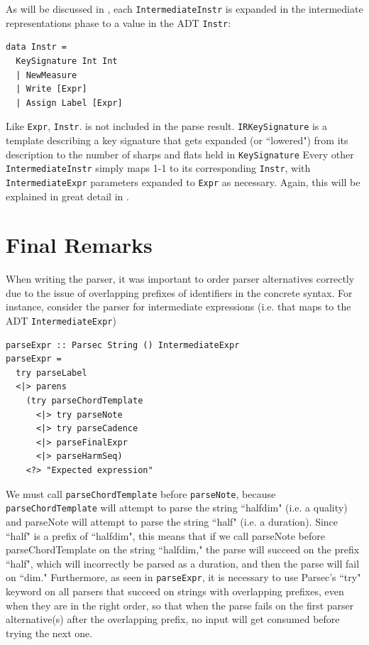 \documentclass{report}
\begin{document}
As will be discussed in , each \verb.IntermediateInstr. is expanded in the intermediate representations phase to a value in the ADT \verb.Instr.:

\begin{verbatim}
data Instr = 
  KeySignature Int Int 
  | NewMeasure 
  | Write [Expr]
  | Assign Label [Expr] 
\end{verbatim}

Like \verb.Expr., \verb.Instr.. is not included in the parse result. \verb.IRKeySignature. is a template describing a key signature that gets expanded (or ``lowered") from its description to the number of sharps and flats held in \verb.KeySignature. Every other \verb.IntermediateInstr. simply maps 1-1 to its corresponding \verb.Instr., with \verb.IntermediateExpr. parameters expanded to \verb.Expr. as necessary. Again, this will be explained in great detail in .

\section{Final Remarks}
\label{sec:finalremarks}

When writing the parser, it was important to order parser alternatives correctly due to the issue of overlapping prefixes of identifiers in the concrete syntax. For instance, consider the parser for intermediate expressions (i.e. that maps to the ADT \verb.IntermediateExpr.)

\begin{verbatim}
parseExpr :: Parsec String () IntermediateExpr
parseExpr = 
  try parseLabel
  <|> parens 
    (try parseChordTemplate 
      <|> try parseNote
      <|> try parseCadence
      <|> parseFinalExpr
      <|> parseHarmSeq)
    <?> "Expected expression"
\end{verbatim}

We must call \verb.parseChordTemplate. before \verb.parseNote., because \verb.parseChordTemplate. will attempt to parse the string ``halfdim" (i.e. a quality) and parseNote will attempt to parse the string ``half" (i.e. a duration). Since ``half" is a prefix of ``halfdim", this means that if we call parseNote before parseChordTemplate on the string ``halfdim," the parse will succeed on the prefix ``half", which will incorrectly be parsed as a duration, and then the parse will fail on ``dim." Furthermore, as seen in \verb.parseExpr., it is necessary to use Parsec's ``try" keyword on all parsers that succeed on strings with overlapping prefixes, even when they are in the right order, so that when the parse fails on the first parser alternative(s) after the overlapping prefix, no input will get consumed before trying the next one.
\end{document}
